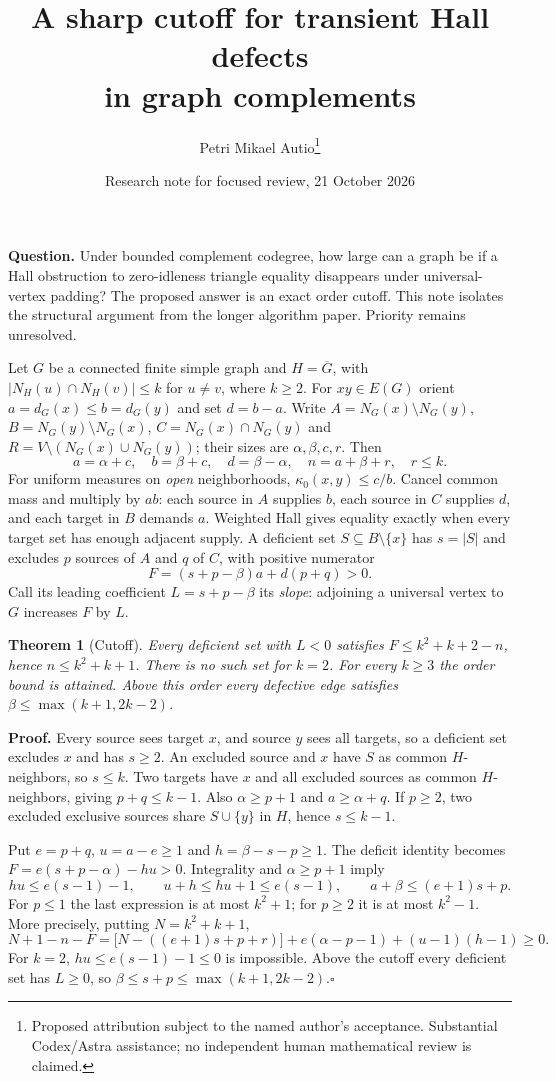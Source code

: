 \documentclass[10pt]{article}
\title{A sharp cutoff for transient Hall defects\\in graph complements}
\author{Petri Mikael Autio\thanks{Proposed attribution subject to the named author's acceptance. Substantial Codex/Astra assistance; no independent human mathematical review is claimed.}}
\date{Research note for focused review, 21 October 2026}
\newtheorem{theorem}{Theorem}
\begin{document}
\maketitle
\vspace{-1.5em}
\textbf{Question.} Under bounded complement codegree, how large can a graph be if a Hall obstruction to zero-idleness triangle equality disappears under universal-vertex padding? The proposed answer is an exact order cutoff. This note isolates the structural argument from the longer algorithm paper. Priority remains unresolved.

Let $G$ be a connected finite simple graph and $H=\overline G$, with
$|N_H(u)\cap N_H(v)|\le k$ for $u\ne v$, where $k\ge2$.
For $xy\in E(G)$ orient $a=d_G(x)\le b=d_G(y)$ and set $d=b-a$.
Write $A=N_G(x)\setminus N_G(y)$, $B=N_G(y)\setminus N_G(x)$,
$C=N_G(x)\cap N_G(y)$ and $R=V\setminus(N_G(x)\cup N_G(y))$;
their sizes are $\alpha,\beta,c,r$. Then
\[
 a=\alpha+c,\quad b=\beta+c,\quad d=\beta-\alpha,\quad n=a+\beta+r,\quad r\le k.
\]
For uniform measures on \emph{open} neighborhoods, $\kappa_0(x,y)\le c/b$.
Cancel common mass and multiply by $ab$: each source in $A$ supplies $b$,
each source in $C$ supplies $d$, and each target in $B$ demands $a$.
Weighted Hall gives equality exactly when every target set has enough adjacent supply.
A deficient set $S\subseteq B\setminus\{x\}$ has $s=|S|$ and excludes $p$ sources of $A$ and $q$ of $C$, with positive numerator
\[
 F=(s+p-\beta)a+d(p+q)>0.
\]
Call its leading coefficient $L=s+p-\beta$ its \emph{slope}: adjoining a universal vertex to $G$ increases $F$ by $L$.

\begin{theorem}[Cutoff]
Every deficient set with $L<0$ satisfies $F\le k^2+k+2-n$, hence $n\le k^2+k+1$. There is no such set for $k=2$. For every $k\ge3$ the order bound is attained.
Above this order every defective edge satisfies
$\beta\le\max(k+1,2k-2)$.
\end{theorem}
\textbf{Proof.}
Every source sees target $x$, and source $y$ sees all targets, so a deficient set excludes $x$ and has $s\ge2$.
An excluded source and $x$ have $S$ as common $H$-neighbors, so $s\le k$.
Two targets have $x$ and all excluded sources as common $H$-neighbors, giving $p+q\le k-1$.
Also $\alpha\ge p+1$ and $a\ge\alpha+q$.
If $p\ge2$, two excluded exclusive sources share $S\cup\{y\}$ in $H$, hence $s\le k-1$.

Put $e=p+q$, $u=a-e\ge1$ and $h=\beta-s-p\ge1$.
The deficit identity becomes $F=e(s+p-\alpha)-hu>0$.
Integrality and $\alpha\ge p+1$ imply
\[
 hu\le e(s-1)-1,\qquad u+h\le hu+1\le e(s-1),\qquad
 a+\beta\le(e+1)s+p.
\]
For $p\le1$ the last expression is at most $k^2+1$; for $p\ge2$ it is at most $k^2-1$. More precisely, putting $N=k^2+k+1$,\[N+1-n-F=\bigl[N-((e+1)s+p+r)\bigr]+e(\alpha-p-1)+(u-1)(h-1)\ge0.\]
For $k=2$, $hu\le e(s-1)-1\le0$ is impossible.
Above the cutoff every deficient set has $L\ge0$, so $\beta\le s+p\le\max(k+1,2k-2)$.\hfill$\square$
\end{document}
